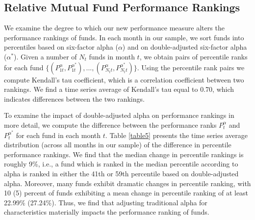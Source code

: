 \subsection{Relative Mutual Fund Performance Rankings}
We examine the degree to which our new performance measure alters the performance rankings of funds. In each month in our sample, we sort funds into percentiles based on six-factor alpha ($\alpha$) and on double-adjusted six-factor alpha ($\alpha^*$). Given a number of $N_t$ funds in month $t$, we obtain pairs of percentile ranks for each fund $\{(P^{\alpha}_{1t},P^{\alpha^*}_{1t}),..., (P^{\alpha}_{N_tt},P^{\alpha^*}_{N_tt})\}$. Using the percentile rank pairs we compute Kendall's tau coefficient, which is a correlation coefficient between two rankings. We find a time series average of Kendall's tau equal to 0.70, which indicates differences between the two rankings. 

To examine the impact of double-adjusted alpha on performance rankings in more detail, we compute the difference between the performance ranks $P^{\alpha}_t$ and $P^{\alpha^*}_t$ for each fund in each month $t$. Table \ref{table5}
presents the time series average distribution (across all months in our sample) of the difference in percentile performance rankings. We find that the median change in percentile rankings is roughly 9\%, i.e., a fund which is ranked in the median percentile according to alpha is ranked in either the 41th or 59th percentile based on double-adjusted alpha. Moreover, many funds exhibit dramatic changes in percentile ranking, with 10 (5) percent of funds exhibiting a mean change in percentile ranking of at least 22.99\% (27.24\%). Thus, we find that adjusting traditional alpha for characteristics materially impacts the performance ranking of funds.


